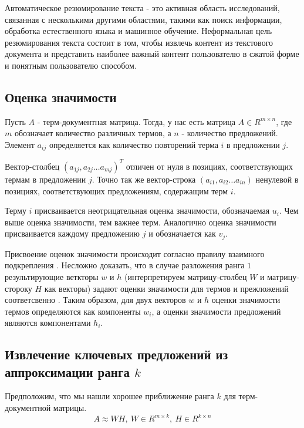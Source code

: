 Автоматическое резюмирование текста - это активная область исследований, связанная с несколькими другими областями,
такими как поиск информации, обработка естественного языка и машинное обучение.
Неформальная цель резюмирования текста состоит в том, чтобы извлечь контент из текстового документа
и представить наиболее важный контент пользователю в сжатой форме и понятным пользователю способом.



\subsection{Оценка значимости}

Пусть $A$ - терм-документная матрица. Тогда, у нас есть матрица $A \in R^{m \times n}$,
где $m$ обозначает количество различных термов, а $n$ - количество предложений.
Элемент $a_{ij}$ определяется как количество повторений терма $i$ в предложении $j$.

Вектор-столбец $(a_{1j}, a_{2j} \ldots a_{mj})^T$ отличен от нуля в позициях, соответствующих термам в предложении $j$.
Точно так же вектор-строка $(a_{i1}, a_{i2} \ldots a_{in})$ ненулевой в позициях, соответствующих предложениям, содержащим терм $i$.

Терму $i$ присваивается неотрицательная оценка значимости, обозначаемая $u_i$.
Чем выше оценка значимости, тем важнее терм. Аналогично оценка значимости присваивается каждому предложению $j$ и обозначается как $v_j$.

Присвоение оценок значимости происходит согласно правилу взаимного подкрепления \cite{zha}.
Несложно доказать, что в случае разложения ранга $1$ результирующие веткторы $w$ и $h$
(интерпретируем матрицу-столбец $W$ и матрицу-стороку $H$ как векторы) задают оценки значимости для термов и прежложений соответсвенно \cite{elden}.
Таким образом, для двух векторов $w$ и $h$ оценки значимости термов определяются как компоненты $w_i$,
а оценки значимости предложений являются компонентами $h_i$.



\newpage



\subsection{Извлечение ключевых предложений из аппроксимации ранга $k$}

Предположим, что мы нашли хорошее приближение ранга $k$ для терм-\\документной матрицы.
\begin{equation*}
  A \approx W H, \ W \in R^{m \times k}, \ H \in R^{k \times n}
\end{equation*}

